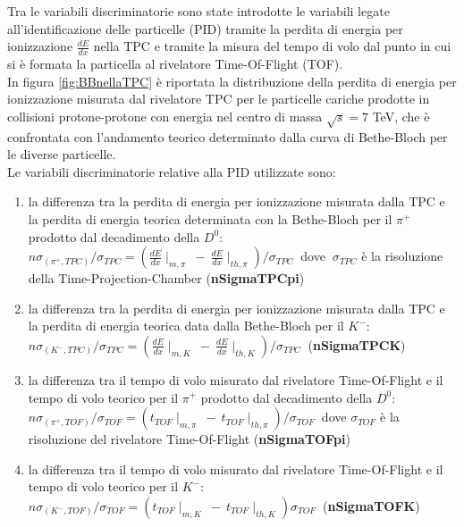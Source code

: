  
 
    
    Tra le variabili discriminatorie sono state introdotte le variabili legate all'identificazione delle particelle (PID) tramite la perdita di energia per ionizzazione $\frac{dE}{dx}$ nella TPC e tramite la misura del tempo di volo dal punto in cui si è formata la particella al rivelatore Time-Of-Flight (TOF).
    \\In figura \ref{fig:BBnellaTPC} è riportata la distribuzione della perdita di energia per ionizzazione misurata dal rivelatore TPC per le particelle cariche prodotte in collisioni protone-protone con energia nel centro di massa $\sqrt{s} = 7 $ TeV, che è confrontata con l'andamento teorico determinato dalla curva di Bethe-Bloch per le diverse particelle.
    \\ Le variabili discriminatorie relative alla PID utilizzate sono:
        \begin{enumerate}[resume]
            \item la differenza tra la perdita di energia per ionizzazione misurata dalla TPC e la perdita di energia teorica determinata con la Bethe-Bloch per il $\pi^+$ prodotto dal decadimento della $D^0$: $n\sigma_{(\pi^+,TPC)}/\sigma_{TPC} = (\frac{dE}{dx}\mid_{m, \pi} \ - \ \frac{dE}{dx}\mid_{th, \pi} ) / \sigma_{TPC} \ $ dove $ \ \sigma_{TPC}$ è la risoluzione della Time-Projection-Chamber (\textbf{nSigmaTPCpi})
            \item la differenza tra la perdita di energia per ionizzazione misurata dalla TPC e la perdita di energia teorica data dalla Bethe-Bloch per il $K^-$: $n\sigma_{(K^-,TPC)}/\sigma_{TPC} = (\frac{dE}{dx}\mid_{m,K} \ - \ \frac{dE}{dx}\mid_{th,K} ) / \sigma_{TPC} \ $ (\textbf{nSigmaTPCK})
            \item la differenza tra il tempo di volo misurato dal rivelatore Time-Of-Flight e il tempo di volo teorico per il  $\pi^+$ prodotto dal decadimento della $D^0$: $ n\sigma_{(\pi^+,TOF)}/\sigma_{TOF} = (t_{TOF}\mid_{m,\pi} \ - \ t_{TOF}\mid_{th,\pi}) / \sigma_{TOF} \ $ dove $\sigma_{TOF}$ è la risoluzione del rivelatore Time-Of-Flight (\textbf{nSigmaTOFpi})
            \item la differenza tra il tempo di volo misurato dal rivelatore Time-Of-Flight e il tempo di volo teorico per il  $K^-$: $n\sigma_{(K^-,TOF)}/\sigma_{TOF} = (t_{TOF}\mid_{m,K} \ - \ t_{TOF}\mid_{th,K})\sigma_{TOF} \ $ (\textbf{nSigmaTOFK})
        \end{enumerate}
    

